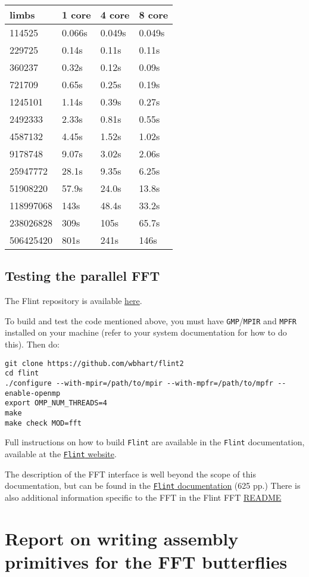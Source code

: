 \begin{longtable}[c]{@{}llll@{}}
\toprule
limbs & 1 core & 4 core & 8 core\tabularnewline
\midrule
\endhead
114525 & 0.066s & 0.049s & 0.049s\tabularnewline
229725 & 0.14s & 0.11s & 0.11s\tabularnewline
360237 & 0.32s & 0.12s & 0.09s\tabularnewline
721709 & 0.65s & 0.25s & 0.19s\tabularnewline
1245101 & 1.14s & 0.39s & 0.27s\tabularnewline
2492333 & 2.33s & 0.81s & 0.55s\tabularnewline
4587132 & 4.45s & 1.52s & 1.02s\tabularnewline
9178748 & 9.07s & 3.02s & 2.06s\tabularnewline
25947772 & 28.1s & 9.35s & 6.25s\tabularnewline
51908220 & 57.9s & 24.0s & 13.8s\tabularnewline
118997068 & 143s & 48.4s & 33.2s\tabularnewline
238026828 & 309s & 105s & 65.7s\tabularnewline
506425420 & 801s & 241s & 146s\tabularnewline
\bottomrule
\end{longtable}

\subsection{Testing the parallel FFT}\label{testing-the-parallel-fft}

The Flint repository is available
\href{https://github.com/wbhart/flint2}{here}.

To build and test the code mentioned above, you must have
\texttt{GMP}/\texttt{MPIR} and \texttt{MPFR} installed on your machine
(refer to your system documentation for how to do this). Then do:

\begin{verbatim}
git clone https://github.com/wbhart/flint2
cd flint
./configure --with-mpir=/path/to/mpir --with-mpfr=/path/to/mpfr --enable-openmp
export OMP_NUM_THREADS=4
make
make check MOD=fft
\end{verbatim}

Full instructions on how to build \texttt{Flint} are available in the
\texttt{Flint} documentation, available at the
\href{http://flintlib.org/}{\texttt{Flint} website}.

The description of the FFT interface is well beyond the scope of this
documentation, but can be found in the
\href{http://flintlib.org/flint-2.5.pdf}{\texttt{Flint} documentation}
(625 pp.) There is also additional information specific to the FFT in
the Flint FFT
\href{https://github.com/wbhart/flint2/tree/trunk/fft}{README}

\section*{Report on writing assembly primitives for the FFT
butterflies}\label{report-on-writing-assembly-primitives-for-the-fft-butterflies}

